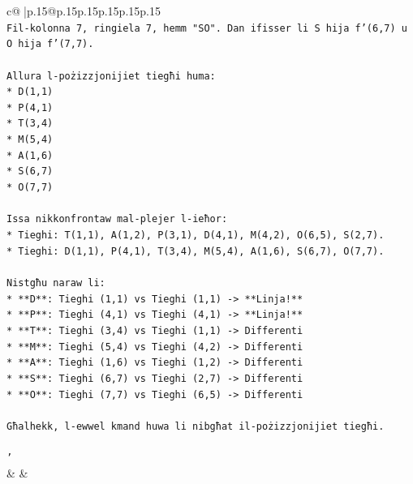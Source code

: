 \documentclass{article}
\begin{document}
{\begin{supertabular}{c@{$\;$}|p{.15\linewidth}@{}p{.15\linewidth}p{.15\linewidth}p{.15\linewidth}p{.15\linewidth}p{.15\linewidth}}
{{{\\ 
\texttt{Fil{-}kolonna 7, ringiela 7, hemm "SO". Dan ifisser li S hija f'(6,7) u O hija f'(7,7).} \\
\\ 
\texttt{Allura l{-}pożizzjonijiet tiegħi huma:} \\
\texttt{*   D(1,1)} \\
\texttt{*   P(4,1)} \\
\texttt{*   T(3,4)} \\
\texttt{*   M(5,4)} \\
\texttt{*   A(1,6)} \\
\texttt{*   S(6,7)} \\
\texttt{*   O(7,7)} \\
\\ 
\texttt{Issa nikkonfrontaw mal{-}plejer l{-}ieħor:} \\
\texttt{*   Tieghi: T(1,1), A(1,2), P(3,1), D(4,1), M(4,2), O(6,5), S(2,7).} \\
\texttt{*   Tieghi: D(1,1), P(4,1), T(3,4), M(5,4), A(1,6), S(6,7), O(7,7).} \\
\\ 
\texttt{Nistgħu naraw li:} \\
\texttt{*   **D**: Tieghi (1,1) vs Tieghi (1,1) {-}> **Linja!**} \\
\texttt{*   **P**: Tieghi (4,1) vs Tieghi (4,1) {-}> **Linja!**} \\
\texttt{*   **T**: Tieghi (3,4) vs Tieghi (1,1) {-}> Differenti} \\
\texttt{*   **M**: Tieghi (5,4) vs Tieghi (4,2) {-}> Differenti} \\
\texttt{*   **A**: Tieghi (1,6) vs Tieghi (1,2) {-}> Differenti} \\
\texttt{*   **S**: Tieghi (6,7) vs Tieghi (2,7) {-}> Differenti} \\
\texttt{*   **O**: Tieghi (7,7) vs Tieghi (6,5) {-}> Differenti} \\
\\ 
\texttt{Għalhekk, l{-}ewwel kmand huwa li nibgħat il{-}pożizzjonijiet tiegħi.} \\
\\ 
\texttt{'} \\
            }
        }
    }
    & & \\ \\


\end{supertabular}}
\end{document}

